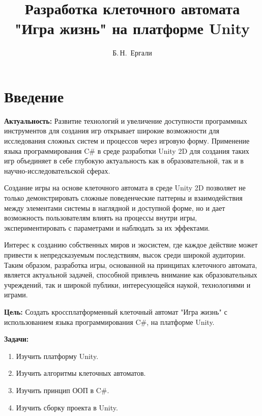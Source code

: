 \documentclass[14pt, oneside]{altsu-report}
\title{Разработка клеточного автомата "Игра жизнь" на платформе Unity}
\author{Б.\,Н.~Ергали}
\institute{Институт цифровых технологий, электроники и физики}
\date{\the\year}
\begin{document}
\maketitle

\setcounter{page}{2}
\makeabstract
\tableofcontents

\chapter*{Введение}

\textbf{Актуальность:}
Развитие технологий и увеличение доступности программных инструментов для создания игр открывает широкие возможности для исследования сложных систем и процессов через игровую форму. Применение языка программирования C\# в среде разработки Unity 2D для создания таких игр объединяет в себе глубокую актуальность как в образовательной, так и в научно-исследовательской сферах.

Создание игры на основе клеточного автомата в среде Unity 2D позволяет не только демонстрировать сложные поведенческие паттерны и взаимодействия между элементами системы в наглядной и доступной форме, но и дает возможность пользователям влиять на процессы внутри игры, экспериментировать с параметрами и наблюдать за их эффектами.

Интерес к созданию собственных миров и экосистем, где каждое действие может привести к непредсказуемым последствиям, высок среди широкой аудитории. Таким образом, разработка игры, основанной на принципах клеточного автомата, является актуальной задачей, способной привлечь внимание как образовательных учреждений, так и широкой публики, интересующейся наукой, технологиями и играми.

\textbf{Цель:}
Создать кроссплатформенный клеточный автомат "Игра жизнь" с использованием языка программирования C\#, на платформе Unity.


\textbf{Задачи:}
\begin{enumerate}
	\item Изучить платформу Unity.
	\item Изучить алгоритмы клеточных автоматов.
	\item Изучить принцип ООП в C\#.
	\item Изучить сборку проекта в Unity.
\end{enumerate}




\end{document}
